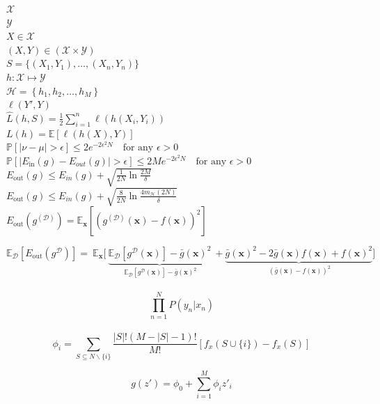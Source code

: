 \documentclass[a4paper, twoside]{tufte-book}
\begin{document}
$\mathcal{X}$ \\
$\mathcal{Y}$ \\
$X \in \mathcal{X}$ \\
$(X, Y) \in \left(\mathcal{X} \times \mathcal{Y} \right)$ \\
$S = \{ (X_1, Y_1), \ldots, (X_n, Y_n) \}$ \\
$h: \mathcal{X} \mapsto \mathcal{Y}$ \\
$\mathcal{H} = \left\{h_1, h_2, \ldots, h_M  \right\}$ \\
$\ell(Y', Y)$ \\
$\hat{L}(h, S) = \frac{1}{2} \sum_{i=1}^{n} \ell(h(X_i, Y_i))$ \\
$L(h) = \mathbb{E} \left[\ell(h(X), Y) \right]$ \\
$\mathbb{P} \left[ |\nu-\mu| > \epsilon \right] \le 2 e^{-2\epsilon^2 N} \quad \text{for any } \epsilon > 0$  \\
$\mathbb{P} \left[ |E_\text{in}(g)-E_{out}(g)| > \epsilon \right] \le 2 M e^{-2\epsilon^2 N} \quad \text{for any } \epsilon > 0$  \\
$E_\text{out}(g) \le E_{in}(g) + \sqrt{\frac{1}{2N} \ln \frac{2M}{\delta}}$ \\ %
$E_\text{out}(g) \le E_{in}(g) + \sqrt{\frac{8}{2N} \ln \frac{4 m_\mathcal{H}(2N)}{\delta}}$ \\ %
$E_\text{out}(g^{(\mathcal{D})}) = \mathbb{E}_\mathbf{x} \left[ \left(g^{(\mathcal{D})}(\mathbf{x}) - f(\mathbf{x}) \right)^2  \right]$ %

$$\mathbb{E}_\mathcal{D} \left[ E_\text{out} \left( g^{\mathcal{D}} \right) \right] = \
\mathbb{E}_\mathbf{x} \biggl[\
\underbrace{\mathbb{E}_\mathcal{D} \left[ g^{\mathcal{D}}\left(\mathbf{x}\right)\right] - \bar{g}\left(\mathbf{x}\right)^2}_{\
\mathbb{E}_\mathcal{D} \left[g^{\mathcal{D}}\left(\mathbf{x}\right)\right] - \bar{g}\left(\mathbf{x}\right)^2} \
+ \underbrace{\bar{g}\left(\mathbf{x}\right)^2 - 2 \bar{g}\left(\mathbf{x}\right)f(\mathbf{x}) + f(\mathbf{x})^2}_{\
\left(\bar{g}(\mathbf{x}) - f(\mathbf{x}) \right)^2} \biggr]$$ \\

$$\prod_{n=1}^{N} P\left( y_n | x_n \right)$$ \\

$$\phi_i = \sum_{S \subseteq N \backslash \{i\}} \frac{|S|!(M-|S|-1)!}{M!} \left[ f_x(S \cup \{i\}) - f_x(S) \right]  $$

$$ g(z') = \phi_0 + \sum_{i=1}^{M} \phi_i {z'}_i $$
\end{document}

